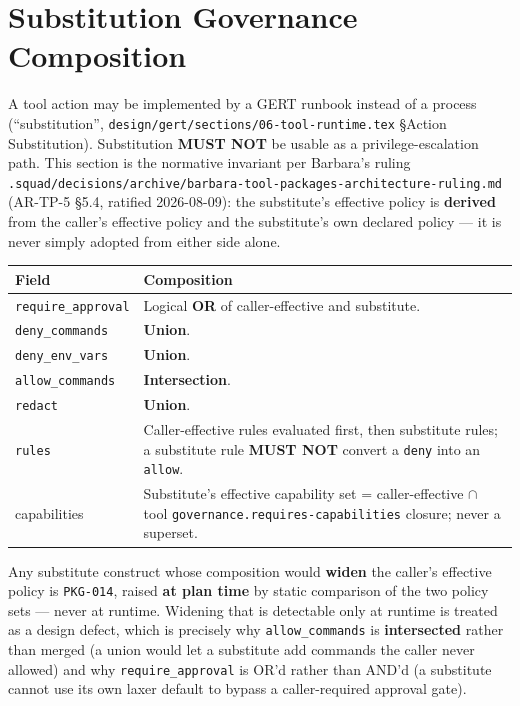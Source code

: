 \section{Substitution Governance Composition}
\label{sec:governance-substitution-composition}

A tool action may be implemented by a GERT runbook instead of a process
(``substitution'', \texttt{design/gert/sections/06-tool-runtime.tex}
\S Action Substitution). Substitution \textbf{MUST NOT} be usable as a
privilege-escalation path. This section is the normative invariant per
Barbara's ruling
\texttt{.squad/decisions/archive/barbara-tool-packages-architecture-ruling.md}
(AR-TP-5 §5.4, ratified 2026-08-09): the substitute's effective policy is
\textbf{derived} from the caller's effective policy and the substitute's own
declared policy --- it is never simply adopted from either side alone.

\begin{center}
\begin{tabular}{p{3.2cm}p{10.8cm}}
\hline
\textbf{Field} & \textbf{Composition} \\
\hline
\texttt{require\_approval} & Logical \textbf{OR} of caller-effective and substitute. \\
\texttt{deny\_commands} & \textbf{Union}. \\
\texttt{deny\_env\_vars} & \textbf{Union}. \\
\texttt{allow\_commands} & \textbf{Intersection}. \\
\texttt{redact} & \textbf{Union}. \\
\texttt{rules} & Caller-effective rules evaluated first, then substitute rules; a substitute rule \textbf{MUST NOT} convert a \texttt{deny} into an \texttt{allow}. \\
capabilities & Substitute's effective capability set = caller-effective $\cap$ tool \texttt{governance.requires-capabilities} closure; never a superset. \\
\hline
\end{tabular}
\end{center}

Any substitute construct whose composition would \textbf{widen} the
caller's effective policy is \texttt{PKG-014}, raised \textbf{at plan time}
by static comparison of the two policy sets --- never at runtime. Widening
that is detectable only at runtime is treated as a design defect, which is
precisely why \texttt{allow\_commands} is \textbf{intersected} rather than
merged (a union would let a substitute add commands the caller never
allowed) and why \texttt{require\_approval} is OR'd rather than AND'd (a
substitute cannot use its own laxer default to bypass a caller-required
approval gate).

